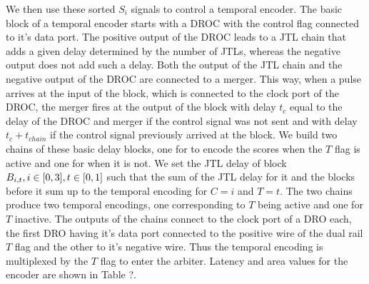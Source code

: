 \documentclass{article}
\begin{document}
We then use these sorted $S_i$ signals to control a temporal encoder.
The basic block of a temporal encoder starts with a DROC with the control flag connected to it's data port.
The positive output of the DROC leads to a JTL chain that adds a given delay determined by the number of JTLs, whereas the negative output does not add such a delay.
Both the output of the JTL chain and the negative output of the DROC are connected to a merger.
This way, when a pulse arrives at the input of the block, which is connected to the clock port of the DROC, the merger fires at the output of the block with delay $t_c$ equal to the delay of the DROC and merger if the control signal was not sent and with delay $t_c + t_{chain}$ if the control signal previously arrived at the block.
We build two chains of these basic delay blocks, one for to encode the scores when the $T$ flag is active and one for when it is not.
We set the JTL delay of block $B_{i,t}, i \in \interval{0}{3}, t \in \interval{0}{1}$ such that the sum of the JTL delay for it and the blocks before it sum up to the temporal encoding for $C = i$ and $T = t$.
The two chains produce two temporal encodings, one corresponding to $T$ being active and one for $T$ inactive.
The outputs of the chains connect to the clock port of a DRO each, the first DRO having it's data port connected to the positive wire of the dual rail $T$ flag and the other to it's negative wire.
Thus the temporal encoding is multiplexed by the $T$ flag to enter the arbiter.
Latency and area values for the encoder are shown in Table ?.
\end{document}
